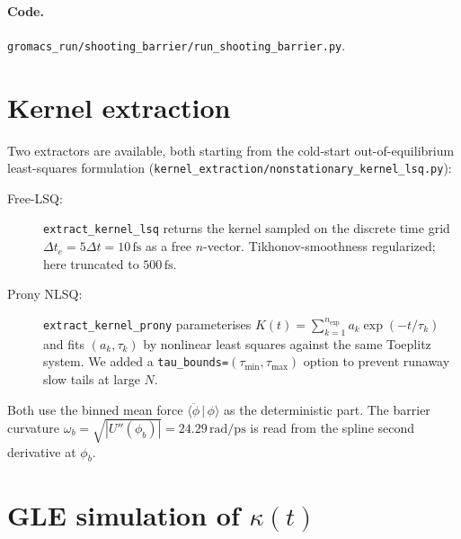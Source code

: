 \documentclass[11pt]{article}
\newcommand{\rad}{\mathrm{rad}}
\newcommand{\ps}{\mathrm{ps}}
\newcommand{\fs}{\mathrm{fs}}
\begin{document}
\paragraph{Code.} \texttt{gromacs\_run/shooting\_barrier/run\_shooting\_barrier.py}.

\section{Kernel extraction}

Two extractors are available, both starting from the cold-start
out-of-equilibrium least-squares formulation
(\texttt{kernel\_extraction/nonstationary\_kernel\_lsq.py}):
\begin{description}
\item[Free-LSQ:] \texttt{extract\_kernel\_lsq} returns the kernel sampled
on the discrete time grid $\Delta t_e = 5 \Delta t = 10\,\fs$ as a free
$n$-vector. Tikhonov-smoothness regularized; here truncated to $500\,\fs$.
\item[Prony NLSQ:] \texttt{extract\_kernel\_prony} parameterises
$K(t) = \sum_{k=1}^{n_\mathrm{exp}} a_k \exp(-t/\tau_k)$ and fits
$(a_k, \tau_k)$ by nonlinear least squares against the same Toeplitz
system. We added a \texttt{tau\_bounds=$(\tau_\mathrm{min},
\tau_\mathrm{max})$} option to prevent runaway slow tails at large $N$.
\end{description}
Both use the binned mean force $\langle\ddot\phi\,|\,\phi\rangle$ as the
deterministic part. The barrier curvature
$\omega_b = \sqrt{|U''(\phi_b)|} = 24.29\,\rad/\ps$ is read from the
spline second derivative at $\phi_b$.

\section{GLE simulation of $\kappa(t)$}
\end{document}

